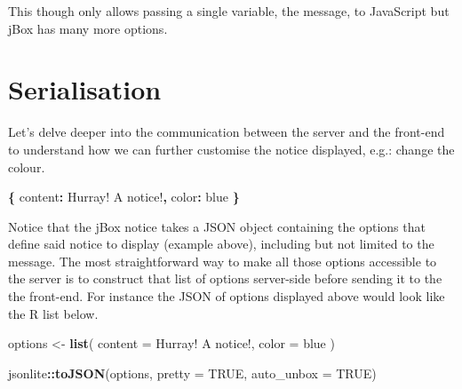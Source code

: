 \documentclass[
]{krantz}
\makeatletter
\newenvironment{Shaded}{\begin{snugshade}}{\end{snugshade}}
\newcommand{\DataTypeTok}[1]{\textcolor[rgb]{0.27,0.27,0.27}{#1}}
\newcommand{\KeywordTok}[1]{\textcolor[rgb]{0.27,0.27,0.27}{\textbf{#1}}}
\newcommand{\NormalTok}[1]{#1}
\newcommand{\OperatorTok}[1]{\textcolor[rgb]{0.43,0.43,0.43}{\textbf{#1}}}
\newcommand{\OtherTok}[1]{\textcolor[rgb]{0.37,0.37,0.37}{#1}}
\newcommand{\StringTok}[1]{\textcolor[rgb]{0.5,0.5,0.5}{#1}}
\newenvironment{kframe}{%
\medskip{}
\setlength{\fboxsep}{.8em}
 \def\at@end@of@kframe{}%
 \ifinner\ifhmode%
  \def\at@end@of@kframe{\end{minipage}}%
  \begin{minipage}{\columnwidth}%
 \fi\fi%
 \def\FrameCommand##1{\hskip\@totalleftmargin \hskip-\fboxsep
 \colorbox{shadecolor}{##1}\hskip-\fboxsep
     \hskip-\linewidth \hskip-\@totalleftmargin \hskip\columnwidth}%
 \MakeFramed {\advance\hsize-\width
   \@totalleftmargin\z@ \linewidth\hsize
   \@setminipage}}%
 {\par\unskip\endMakeFramed%
 \at@end@of@kframe}
\renewenvironment{Shaded}{\begin{kframe}}{\end{kframe}}
\makeatother
\begin{document}
\begin{Shaded}
\end{Shaded}

This though only allows passing a single variable, the message, to JavaScript but jBox has many more options.

\hypertarget{serialisation}{%
\section{Serialisation}\label{serialisation}}

Let's delve deeper into the communication between the server and the front-end to understand how we can further customise the notice displayed, e.g.: change the colour.

\begin{Shaded}
\begin{Highlighting}[]
\OperatorTok{\{}
  \DataTypeTok{content}\OperatorTok{:} \StringTok{\textquotesingle{}Hurray! A notice!\textquotesingle{}}\OperatorTok{,}
  \DataTypeTok{color}\OperatorTok{:} \StringTok{\textquotesingle{}blue\textquotesingle{}}
\OperatorTok{\}}
\end{Highlighting}
\end{Shaded}

Notice that the jBox notice takes a JSON object containing the options that define said notice to display (example above), including but not limited to the message. The most straightforward way to make all those options accessible to the server is to construct that list of options server-side before sending it to the the front-end. For instance the JSON of options displayed above would look like the R list below.

\begin{Shaded}
\begin{Highlighting}[]
\NormalTok{options <{-}}\StringTok{ }\KeywordTok{list}\NormalTok{(}
  \DataTypeTok{content =} \StringTok{\textquotesingle{}Hurray! A notice!\textquotesingle{}}\NormalTok{,}
  \DataTypeTok{color =} \StringTok{\textquotesingle{}blue\textquotesingle{}}
\NormalTok{)}

\NormalTok{jsonlite}\OperatorTok{::}\KeywordTok{toJSON}\NormalTok{(options, }\DataTypeTok{pretty =} \OtherTok{TRUE}\NormalTok{, }\DataTypeTok{auto\_unbox =} \OtherTok{TRUE}\NormalTok{)}
\end{Highlighting}
\end{Shaded}
\end{document}

